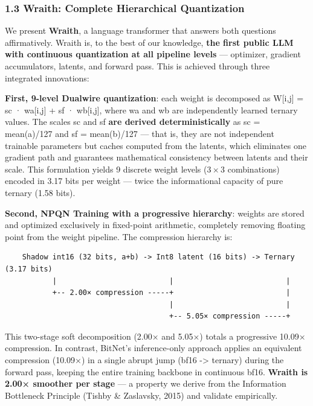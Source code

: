 \subsubsection{1.3 Wraith: Complete Hierarchical
Quantization}\label{wraith-complete-hierarchical-quantization}

We present \textbf{Wraith}, a language transformer that answers both
questions affirmatively. Wraith is, to the best of our knowledge,
\textbf{the first public LLM with continuous quantization at all
pipeline levels} --- optimizer, gradient accumulators, latents, and
forward pass. This is achieved through three integrated innovations:

\textbf{First, 9-level Dualwire quantization}: each weight is decomposed
as W{[}i,j{]} = sc · wa{[}i,j{]} + sf · wb{[}i,j{]}, where wa and wb are
independently learned ternary values. The scales sc and sf \textbf{are
derived deterministically} as sc = mean(\textbar a\textbar)/127 and sf =
mean(\textbar b\textbar)/127 --- that is, they are not independent
trainable parameters but caches computed from the latents, which
eliminates one gradient path and guarantees mathematical consistency
between latents and their scale. This formulation yields 9 discrete
weight levels (\(3 \times 3\) combinations) encoded in 3.17 bits per
weight --- twice the informational capacity of pure ternary (1.58 bits).

\textbf{Second, NPQN Training with a progressive hierarchy}: weights are
stored and optimized exclusively in fixed-point arithmetic, completely
removing floating point from the weight pipeline. The compression
hierarchy is:

\begin{verbatim}
    Shadow int16 (32 bits, a+b) -> Int8 latent (16 bits) -> Ternary (3.17 bits)
           |                          |                          |
           +-- 2.00× compression -----+                          |
                                      |                          |
                                      +-- 5.05× compression -----+
\end{verbatim}

This two-stage soft decomposition (2.00× and 5.05×) totals a progressive
10.09× compression. In contrast, BitNet's inference-only approach
applies an equivalent compression (10.09×) in a single abrupt jump (bf16
-> ternary) during the forward pass, keeping the entire training backbone
in continuous bf16. \textbf{Wraith is 2.00× smoother per stage} --- a
property we derive from the Information Bottleneck Principle (Tishby \&
Zaslavsky, 2015) and validate empirically.

